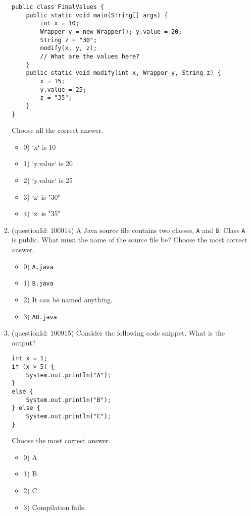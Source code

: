 \documentclass[12pt]{article}
\begin{document}
\begin{enumerate}[label=(\arabic*)]
\begin{verbatim}
public class FinalValues {
    public static void main(String[] args) {
        int x = 10;
        Wrapper y = new Wrapper(); y.value = 20;
        String z = "30";
        modify(x, y, z);
        // What are the values here?
    }
    public static void modify(int x, Wrapper y, String z) {
        x = 15;
        y.value = 25;
        z = "35";
    }
}
\end{verbatim}
Choose all the correct answer.\begin{itemize}
\item 0) `x` is 10

\item 1) `y.value` is 20

\item 2) `y.value` is 25

\item 3) `z` is "30"

\item 4) `z` is "35"

\end{itemize}
\item (questionId: 100014) A Java source file contains two classes, \verb|A| and \verb|B|. Class \verb|A| is public. What must the name of the source file be?
Choose the most correct answer. 
\begin{itemize}
\item 0) \verb|A.java|

\item 1) \verb|B.java|

\item 2) It can be named anything.

\item 3) \verb|AB.java|

\end{itemize}
\item (questionId: 100915) Consider the following code snippet. What is the output?\n\begin{verbatim}
int x = 1;
if (x > 5) {
    System.out.println("A");
}
else {
    System.out.println("B");
} else {
    System.out.println("C");
}
\end{verbatim}
Choose the most correct answer. 
\begin{itemize}
\item 0) A

\item 1) B

\item 2) C

\item 3) Compilation fails.


\end{itemize}
\end{enumerate}
\end{document}
